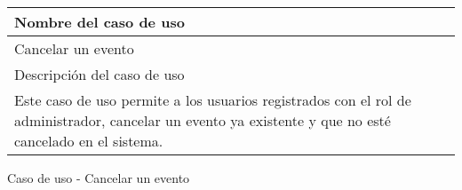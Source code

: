 \begin{identificacionCasoDeUso}
	\begin{tabular} { | p{17cm} |}

		\hline
		Nombre del caso de uso                                                                                                                                  \\ \hline
		Cancelar un evento                                                                                                                                      \\ \hline
		Descripción del caso de uso                                                                                                                             \\ \hline
		Este caso de uso permite a los usuarios registrados con el rol de administrador, cancelar un evento ya existente y que no esté cancelado en el sistema. \\ \hline
	\end{tabular}
	\caption{Caso de uso - Cancelar un evento}
\end{identificacionCasoDeUso}